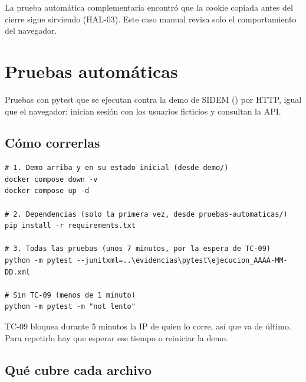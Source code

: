 \documentclass[11pt,a4paper,oneside]{report}
\newcommand{\code}[1]{\leavevmode{\ttfamily\color{tinta}#1}}
\begin{document}
\begin{nota}
La prueba automática complementaria encontró que la cookie copiada antes del cierre sigue sirviendo (HAL-03). Este caso manual revisa solo el comportamiento del navegador.

\end{nota}

\chapter*{Pruebas automáticas}

Pruebas con pytest que se ejecutan contra la demo de SIDEM (\code{demo/}) por HTTP, igual que el navegador: inician sesión con los usuarios ficticios y consultan la API.


\section*{Cómo correrlas}

\begin{lstlisting}
# 1. Demo arriba y en su estado inicial (desde demo/)
docker compose down -v
docker compose up -d

# 2. Dependencias (solo la primera vez, desde pruebas-automaticas/)
pip install -r requirements.txt

# 3. Todas las pruebas (unos 7 minutos, por la espera de TC-09)
python -m pytest --junitxml=..\evidencias\pytest\ejecucion_AAAA-MM-DD.xml

# Sin TC-09 (menos de 1 minuto)
python -m pytest -m "not lento"
\end{lstlisting}

TC-09 bloquea durante 5 minutos la IP de quien lo corre, así que va de último. Para repetirlo hay que esperar ese tiempo o reiniciar la demo.


\Needspace{150pt}\section*{Qué cubre cada archivo}
\end{document}
